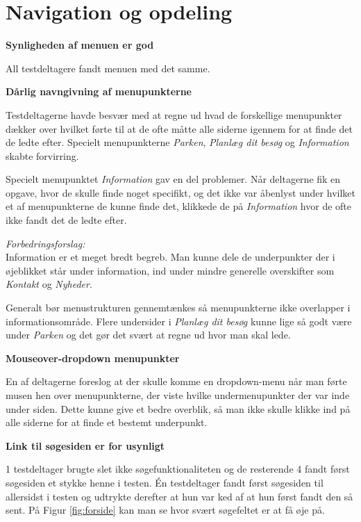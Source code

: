 \documentclass[10pt,a4paper]{article}      %
\newenvironment{forslag}{\emph{Forbedringsforslag:}\\[0.5mm]}{}
\newcommand\pic[1]{\texttt{[image: Pics/\#1]}}
\renewcommand\good{\pic{good}}
\renewcommand\goodidea{\pic{goodidea}}
\renewcommand\seriousproblem{\pic{seriousproblem}}
\begin{document}
\section{Navigation og opdeling}
\begin{kommentarer}

\item[\good]{\textbf{Synligheden af menuen er god}}

All testdeltagere fandt menuen med det samme.

\item[\seriousproblem]{\textbf{Dårlig navngivning af menupunkterne}}

Testdeltagerne havde besvær med at regne ud hvad de forskellige menupunkter
dækker over hvilket førte til at de ofte måtte alle siderne igennem for at finde
det de ledte efter. Specielt menupunkterne \emph{Parken}, \emph{Planlæg dit
besøg} og \emph{Information} skabte forvirring.

Specielt menupunktet \emph{Information} gav en del problemer. Når deltagerne fik en opgave,
hvor de skulle finde noget specifikt, og det ikke var åbenlyst under hvilket et af
menupunkterne de kunne finde det, klikkede de på \emph{Information} hvor de ofte ikke fandt
det de ledte efter.

\begin{forslag}
    Information er et meget bredt begreb. Man kunne dele de underpunkter der i øjeblikket
står under information, ind under mindre generelle overskifter som \emph{Kontakt} og
\emph{Nyheder}.

    Generalt bør menustrukturen gennemtænkes så menupunkterne ikke overlapper i
informationsområde. Flere undersider i \emph{Planlæg dit besøg} kunne lige så godt være under
\emph{Parken} og det gør det svært at regne ud hvor man skal lede.
\end{forslag}

\item[\goodidea] \textbf{Mouseover-dropdown menupunkter}

En af deltagerne foreslog at der skulle komme en dropdown-menu når man førte
musen hen over menupunkterne, der viste hvilke undermenupunkter der var inde
under siden. Dette kunne give et bedre overblik, så man ikke skulle klikke ind
på alle siderne for at finde et bestemt underpunkt.

\item[\seriousproblem]{\textbf{Link til søgesiden er for usynligt}}

1 testdeltager brugte slet ikke søgefunktionaliteten og de resterende 4 fandt
først søgesiden et stykke henne i testen. Én testdeltager fandt først søgesiden
til allersidst i testen og udtrykte derefter at hun var ked af at hun først
fandt den så sent. På Figur \ref{fig:forside} kan man se hvor svært søgefeltet
er at få øje på.


\end{kommentarer}
\end{document}

